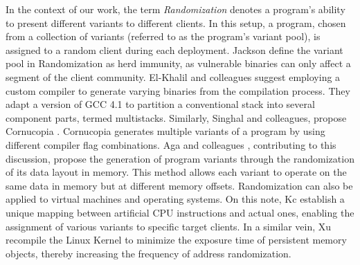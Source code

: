 In the context of our work, the term \emph{Randomization} denotes a program's ability to present different variants to different clients. 
In this setup, a program, chosen from a collection of variants (referred to as the program's variant pool), is assigned to a random client during each deployment. 
Jackson \etal \cite{jackson} define the variant pool in Randomization as herd immunity, as vulnerable binaries can only affect a segment of the client community. 
El-Khalil and colleagues \cite{ElKhalil2004} suggest employing a custom compiler to generate varying binaries from the compilation process. 
They adapt a version of GCC 4.1 to partition a conventional stack into several component parts, termed multistacks. 
Similarly, Singhal and colleagues, propose Cornucopia \cite{cornucopia}.
Cornucopia generates multiple variants of a program by using different compiler flag combinations.
Aga and colleagues \cite{aga2019smokestack}, contributing to this discussion, propose the generation of program variants through the randomization of its data layout in memory. 
This method allows each variant to operate on the same data in memory but at different memory offsets. 
Randomization can also be applied to virtual machines and operating systems. On this note, Kc \etal \cite{Kc03} establish a unique mapping between artificial CPU instructions and actual ones, enabling the assignment of various variants to specific target clients. 
In a similar vein, Xu \etal \cite{xu2020merr} recompile the Linux Kernel to minimize the exposure time of persistent memory objects, thereby increasing the frequency of address randomization.


